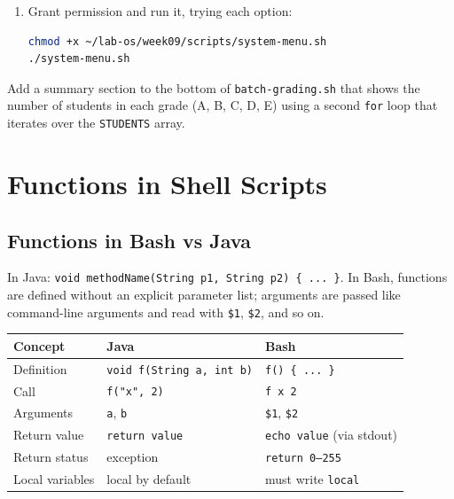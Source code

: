 \begin{enumerate}
\begin{lstlisting}[language=bash, caption={Contents of system-menu.sh}]
    case $CHOICE in
        1) df -h ;;
        2) free -h ;;
        3) ps aux --sort=-%cpu | head -6 ;;
        4) echo "Goodbye!"; exit 0 ;;
        *) echo "Invalid choice." ;;
    esac
done
\end{lstlisting}

  \item Grant permission and run it, trying each option:
\begin{lstlisting}[language=bash, caption={Running the menu}]
chmod +x ~/lab-os/week09/scripts/system-menu.sh
./system-menu.sh
\end{lstlisting}
\end{enumerate}

\begin{exercisebox}[Exercise 9.3]
Add a summary section to the bottom of \texttt{batch-grading.sh} that shows
the number of students in each grade (A, B, C, D, E) using a second
\texttt{for} loop that iterates over the \texttt{STUDENTS} array.
\end{exercisebox}

\section{Functions in Shell Scripts}
\label{sec:functions-shell-scripts}

\subsection*{Functions in Bash vs Java}

In Java: \texttt{void methodName(String p1, String p2) \{ ... \}}. In Bash,
functions are defined without an explicit parameter list; arguments are passed
like command-line arguments and read with \texttt{\$1}, \texttt{\$2}, and so
on.

\begin{center}
\begin{tabular}{lll}
\hline
\textbf{Concept} & \textbf{Java} & \textbf{Bash} \\
\hline
Definition & \texttt{void f(String a, int b)} & \texttt{f() \{ ... \}} \\
Call & \texttt{f("x", 2)} & \texttt{f x 2} \\
Arguments & \texttt{a}, \texttt{b} & \texttt{\$1}, \texttt{\$2} \\
Return value & \texttt{return value} & \texttt{echo value} (via stdout) \\
Return status & exception & \texttt{return 0--255} \\
Local variables & local by default & must write \texttt{local} \\
\hline
\end{tabular}
\end{center}

